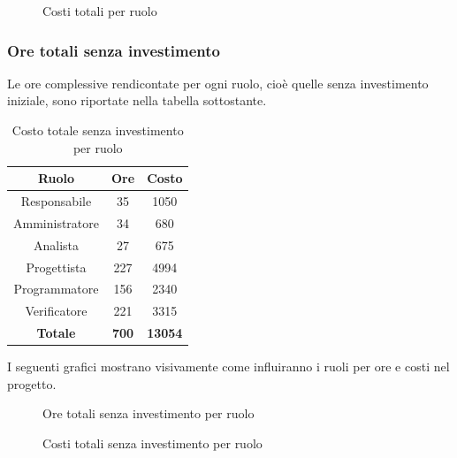 \begin{figure}[H]
	\centering
	\caption{Costi totali per ruolo}
\end{figure}

\subsubsection{Ore totali senza investimento}
Le ore complessive rendicontate per ogni ruolo, cioè quelle senza investimento iniziale, sono riportate nella tabella sottostante.
\begin{table}[H]
	\centering
	\begin{tabular}{|c|c|c|}
		\hline
		\textbf{Ruolo} &
		\textbf{Ore} &
		\textbf{Costo} \\
		\hline
		Responsabile & 35 & 1050\\
		\hline
		Amministratore & 34 & 680\\
		\hline
		Analista & 27 & 675\\
		\hline
		Progettista & 227 & 4994 \\
		\hline
		Programmatore & 156 & 2340 \\
		\hline
		Verificatore & 221 & 3315\\
		\hline
		\textbf{Totale} & \textbf{700} & \textbf{13054} \\
		\hline
	\end{tabular}
	\caption{Costo totale senza investimento per ruolo}
\end{table}
I seguenti grafici mostrano visivamente come influiranno i ruoli per ore e costi nel progetto.
\begin{figure}[H]
	\centering
	\caption{Ore totali senza investimento per ruolo}
\end{figure}
\begin{figure}[H]
	\centering
	\caption{Costi totali senza investimento per ruolo}
\end{figure}





